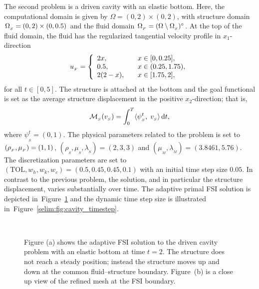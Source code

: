 The second problem is a driven cavity with an elastic bottom. Here,
the computational domain is given by $\Omega = (0,2)\times (0,2)$,
with structure domain $\Omega_{_{S}} = (0, 2)\times (0, 0.5)$ and the fluid
domain $\Omega_{_{F}} = (\Omega\setminus \Omega_{_{S}})^{\circ}$. At the top of the fluid
domain, the fluid has the regularized tangential velocity profile in
$x_1$-direction
\begin{equation}
u_{_{F}} =
\left\{
\begin{array}{lcl}
2x,& &x\in[0, 0.25],\\
0.5,& &x\in(0.25 ,1.75),\\
2(2-x),&  &x\in[1.75, 2],
\end{array}
\right.
\end{equation}
for all $t \in [0,5]$. The structure is attached at the bottom and the
goal functional is set as the average structure displacement in the positive
$x_2$-direction; that is,
\begin{equation}
\label{selim:eq:goalfunctional_cavity}
\mathcal{M}_{_{S}}(v_{_{S}}) = \int_0^T \langle \psi^t_{_{S}},\; v_{_{S}}\rangle \, \mathrm{d}t,
\end{equation}
where $\psi^t_{_{S}}=(0,1)$.  The physical parameters related to the
problem is set to $(\rho_{_{F}},\mu_{_{F}}) = (1, 1)$,
$(\rho_{_{S}},\mu_{_{S}}, \lambda_{_{S}}) = (2, 3, 3)$ and
$(\mu_{_{M}}, \lambda_{_{M}}) = (3.8461, 5.76)$. The discretization
parameters are set to\break $(\mathrm{TOL}, w_h, w_k,w_c) = (0.5, 0.45,
0.45, 0.1)$ with an initial time step size $0.05$.  In contrast to the
previous problem, the solution, and in particular the structure
displacement, varies substantially over time. The adaptive primal FSI
solution is depicted in~Figure~\ref{selim:fig:primal_cavity} and the
dynamic time step size is illustrated
in~Figure~\ref{selim:fig:cavity_timestep}.

\begin{figure}
\bwfig
  \centering
   \\
  \caption{Figure (a) shows the adaptive FSI solution to the driven
    cavity problem with an elastic bottom at time $t=2$. The structure
    does not reach a steady position; instead the structure moves up and
    down at the common fluid--structure boundary. Figure~(b) is a close
    up view of the refined mesh at the FSI boundary.}
  \label{selim:fig:primal_cavity}
\end{figure}


